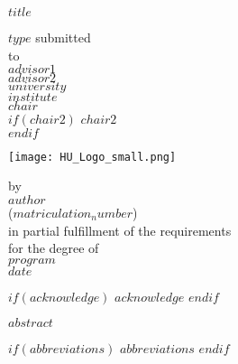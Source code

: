 \documentclass[a4paper,11pt]{article}
\begin{document}
\thispagestyle{empty}
\begin{center}
  {\Large{\bf $title$}} \vspace{0.5cm}

  $type$ submitted \\\vspace{0.5cm}
  to \\\vspace{0.5cm}
  \textbf{$advisor1$} \\
  \textbf{$advisor2$} \\\vspace{0.5cm}
  $university$ \\
  $institute$ \\
  $chair$ \\
  $if(chair2)$ $chair2$ \\ $endif$ \vspace{1cm}

  \texttt{[image: HU\_Logo\_small.png]}
  
  by \\\vspace{0.5cm}
  \textbf{$author$} \\
  ($matriculation_number$) \\
  
  \medskip
  \medskip
  in partial fulfillment of the requirements \\
  for the degree of \\
  \textbf{$program$} \\\vspace{0.5cm}
  $date$
  
\end{center}

$if(acknowledge)$
\newpage
$acknowledge$
$endif$
\pagestyle{plain}
\setcounter{page}{1}    %

\newpage
$abstract$

\newpage
\tableofcontents
\clearpage

$if(abbreviations)$
\newpage
$abbreviations$
$endif$
\end{document}

